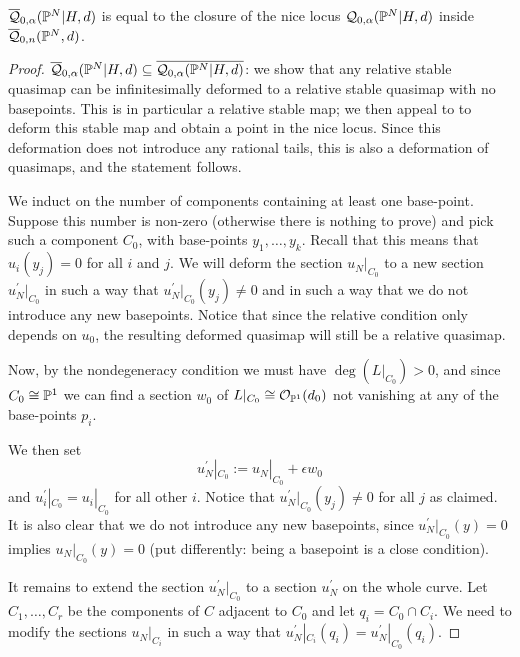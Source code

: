 \begin{lem}
$\overline{\mathcal Q}_{0,\alpha}(\mathbb P^N|H,d)$ is equal to the closure of the nice locus $\mathcal{Q}_{0,\alpha}(\mathbb P^N|H,d)$ inside $\overline{\mathcal Q}_{0,n}(\mathbb P^N,d)$. 
\end{lem}
\begin{proof}
$\overline{\mathcal Q}_{0,\alpha}(\mathbb P^N|H,d)\subseteq\overline{\mathcal Q_{0,\alpha}(\mathbb P^N|H,d)}$: we show that any relative stable quasimap can be infinitesimally deformed to a relative stable quasimap with no basepoints. This is in particular a relative stable map; we then appeal to \cite[Prop. 1.14]{Ga} to deform this stable map and obtain a point in the nice locus. Since this deformation does not introduce any rational tails, this is also a deformation of quasimaps, and the statement follows.

We induct on the number of components containing at least one base-point. Suppose this number is non-zero (otherwise there is nothing to prove) and pick such a component $C_0$, with base-points $y_1 ,\ldots, y_k$. Recall that this means that $u_i(y_j)=0$ for all $i$ and $j$. We will deform the section $u_N|_{C_0}$ to a new section $u_N^\prime|_{C_0}$ in such a way that $u_N^\prime|_{C_0}(y_j) \neq 0$ and in such a way that we do not introduce any new basepoints. Notice that since the relative condition only depends on $u_0$, the resulting deformed quasimap will still be a relative quasimap.

Now, by the nondegeneracy condition we must have $\deg(L|_{C_0})>0$, and since $C_0 \cong \mathbb P^1$ we can find a section $w_0$ of $L|_{C_0} \cong \mathcal{O}_{\mathbb P^1}(d_0)$ not vanishing at any of the base-points $p_i$.

We then set
\begin{equation*} u_N^\prime|_{C_0} := u_N|_{C_0} + \epsilon w_0 \end{equation*}
and $u_i^\prime|_{C_0} = u_i|_{C_0}$ for all other $i$. Notice that $u_N^\prime|_{C_0}(y_j) \neq 0$ for all $j$ as claimed. It is also clear that we do not introduce any new basepoints, since $u_N^\prime|_{C_0}(y) = 0$ implies $u_N|_{C_0}(y)=0$ (put differently: being a basepoint is a close condition).

It remains to extend the section $u_N^\prime|_{C_0}$ to a section $u_N^\prime$ on the whole curve. Let $C_1, \ldots, C_r$ be the components of $C$ adjacent to $C_0$ and let $q_i = C_0 \cap C_i$. We need to modify the sections $u_N|_{C_i}$ in such a way that $u_N^\prime|_{C_i}(q_i) = u_N^\prime|_{C_0}(q_i)$.


\end{proof}
